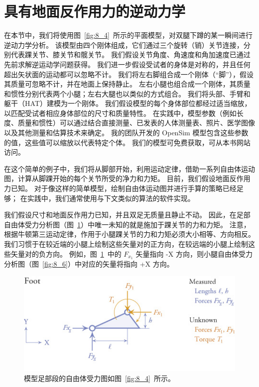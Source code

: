 \section{具有地面反作用力的逆动力学}


在本节中，我们将使用图~\ref{fig:8_4}~所示的平面模型，对双腿下蹲的某一瞬间进行逆动力学分析。
该模型由四个刚体组成，它们通过三个旋转（销）关节连接，分别代表踝关节、膝关节和髋关节。
我们假设关节角度、角速度和角加速度已通过先前求解逆运动学问题获得。
我们进一步假设受试者的身体是对称的，并且任何超出矢状面的运动都可以忽略不计。
我们将左右脚组合成一个刚体（“脚”），假设其质量可忽略不计，并在地面上保持静止。
左右小腿也组合成一个刚体，其质量和惯性分别代表两个小腿；左右大腿也以类似的方式组合。
我们将头部、手臂和躯干（HAT）建模为一个刚体。
我们假设模型的每个身体部位都经过适当缩放，以匹配受试者相应身体部位的尺寸和质量特性。
在实践中，模型参数（例如长度、质量和惯性）可以通过结合直接测量、已发表的人体测量表、照片、医学图像以及其他测量和估算技术来确定。
我的团队开发的 OpenSim 模型包含这些参数的值，这些值可以缩放以代表特定个体。
我们的模型可免费获取，可从本书网站访问。


在这个简单的例子中，我们将从脚部开始，利用运动定律，借助一系列自由体运动图，计算从脚踝开始的每个关节所受的净力和力矩。
目前，我们假设地面反作用力已知。
对于像这样的简单模型，绘制自由体运动图并进行手算的策略已经足够；
在实践中，我们通常使用与下文类似的算法的软件实现。


我们假设尺寸和地面反作用力已知，并且双足无质量且静止不动。
因此，在足部自由体受力分析图（图~\ref{fig:8_5}）中唯一未知的就是施加于踝关节的力和力矩。
注意，根据牛顿第三运动定律，作用于小腿踝关节的力和力矩必须大小相等、方向相反。
我们习惯于在较近端的小腿上绘制这些矢量对的正方向，在较远端的小腿上绘制这些矢量对的负方向。
例如，图~\ref{fig:8_5}~中的 $F_{x_1}$ 矢量指向 -X 方向，则小腿自由体受力分析图（图~\ref{fig:8_6}）中对应的矢量将指向 +X 方向。


\begin{figure}[!htb]
	\centering
	\includegraphics[width=0.7\linewidth]{chap8/8_5}
	\caption{模型足部段的自由体受力图如图~\ref{fig:8_4}~所示。 \label{fig:8_5}}
\end{figure}


